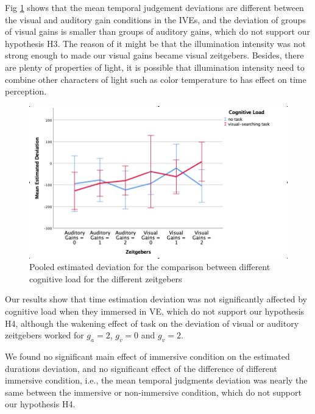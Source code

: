 \documentclass[sigconf]{acmart}
\begin{document}

Fig \ref{fig:linedeviation} shows that the mean temporal judgement deviations are different between the visual and auditory gain conditions in the IVEs, and the deviation of groups of visual gains is smaller than groups of auditory gains, which do not support our hypothesis H3. The reason of it might be that the illumination intensity was not strong enough to made our visual gains became visual zeitgebers. Besides, there are plenty of properties of light, it is possible that illumination intensity need to combine other characters of light such as color temperature to has effect on time perception.

\begin{figure}[h]
  \centering
  \includegraphics[width=\linewidth]{aaafiles/linedeviation}
  \caption{Pooled estimated deviation for the comparison between different cognitive load for the different zeitgebers}
  \label{fig:linedeviation}
\end{figure}

Our results show that time estimation deviation was not significantly affected by cognitive load when they immersed in VE, which do not support our hypothesis H4, although the wakening effect of task on the deviation of visual or auditory zeitgebers worked for $g_a = 2$, $g_v = 0$ and $g_v = 2$.

We found no significant main effect of immersive condition on the estimated durations deviation, and no significant effect of the difference of different immersive condition, i.e., the mean temporal judgments deviation was nearly the same between the immersive or non-immersive condition, which do not support our hypothesis H4.
\end{document}
